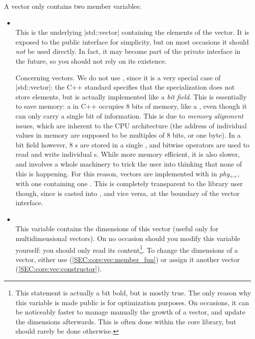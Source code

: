 \documentclass[12pt]{report}
\newcommand{\phypp}{\textit{phy}$_{\text{++}}$\xspace}
\newcommand{\stdvec}{\cppinline|std::vector|\xspace}
\newenvironment{advanced}
{
    \begin{mdframed}[style=advanced,frametitle={Advanced}]
}
{
    \end{mdframed}
}
\begin{document}
A vector only contains two member variables:
\begin{itemize}
\item {} \\ This is the underlying \stdvec containing the elements of the vector. It is exposed to the public interface for simplicity, but on most occasions it should \emph{not} be used directly. In fact, it may become part of the private interface in the future, so you should not rely on its existence.

\begin{advanced}
Concerning  vectors. We do not use , since it is a very special case of \stdvec: the C++ standard specifies that the  specialization does not store  elements, but is actually implemented like a \emph{bit field}. This is essentially to save memory: a  in C++ occupies $8$ bits of memory, like a , even though it can only carry a single bit of information. This is due to \emph{memory alignment} issues, which are inherent to the CPU architecture (the address of individual values in memory are supposed to be multiples of $8$ bits, or one byte). In a bit field however, $8$ s are stored in a single , and bitwise operators are used to read and write individual s. While more memory efficient, it is also slower, and involves a whole machinery to trick the user into thinking that none of this is happening. For this reason,  vectors are implemented with  in \phypp, with one  containing one . This is completely transparent to the library user though, since  is casted into , and vice versa, at the boundary of the vector interface.
\end{advanced}

\item {} \\ This variable contains the dimensions of this vector (useful only for multidimensional vectors). On no occasion should you modify this variable yourself: you should only read its content\footnote{This statement is actually a bit bold, but is mostly true. The only reason why this variable is made public is for optimization purposes. On occasions, it can be noticeably faster to manage manually the growth of a vector, and update the dimensions afterwards. This is often done within the core library, but should rarely be done otherwise.}. To change the dimensions of a vector, either use  (\ref{SEC:core:vec:member_fun}) or assign it another vector (\ref{SEC:core:vec:constructor}).


\end{itemize}
\end{document}
